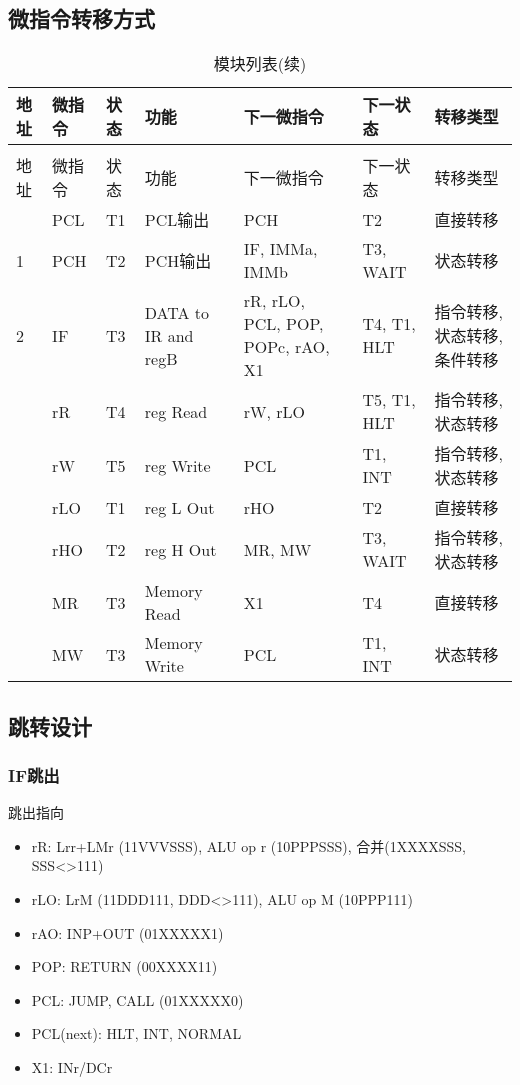 \documentclass[10pt]{book}
\begin{document}
\subsection{微指令转移方式}
\begin{landscape}
\begin{longtable}{|l|l|l|l|l|l|l|}
\caption{微程序表} \\
\hline
地址 & 微指令 & 状态 & 功能 & 下一微指令 & 下一状态 & 转移类型             \\
\hline
\endfirsthead
\caption{模块列表(续)} \\
\hline
地址 & 微指令 & 状态 & 功能 & 下一微指令 & 下一状态 & 转移类型             \\
\hline
\endhead
\hline
\endfoot
0	& PCL	& T1 	& PCL输出 				& PCH 								& T2 			& 直接转移 \\
1	& PCH 	& T2 	& PCH输出 				& IF, IMMa, IMMb					& T3, WAIT 		& 状态转移 \\
2	& IF  	& T3 	& DATA to IR and regB 	& rR, rLO, PCL, POP, POPc, rAO, X1	& T4, T1, HLT	& 指令转移, 状态转移, 条件转移 \\ 
& rR  	& T4 	& reg Read  			& rW, rLO		 					& T5, T1, HLT 	& 指令转移, 状态转移  \\
& rW  	& T5 	& reg Write 			& PCL								& T1, INT		& 指令转移, 状态转移 \\
& rLO 	& T1 	& reg L Out 			& rHO								& T2			& 直接转移 \\
& rHO 	& T2 	& reg H Out 			& MR, MW							& T3, WAIT		& 指令转移, 状态转移 \\
& MR  	& T3	& Memory Read 			& X1								& T4			& 直接转移 \\
& MW  	& T3	& Memory Write 			& PCL								& T1, INT		& 状态转移 \\ 
\end{longtable}
\end{landscape}

\subsection{跳转设计}
\subsubsection{IF跳出}
跳出指向
\begin{itemize}
  \item rR: Lrr+LMr (11VVVSSS), ALU op r (10PPPSSS), 合并(1XXXXSSS, SSS<>111)
  \item rLO: LrM (11DDD111, DDD<>111), ALU op M (10PPP111)
  \item rAO: INP+OUT (01XXXXX1)
  \item POP: RETURN (00XXXX11)
  \item PCL: JUMP, CALL (01XXXXX0)
  \item PCL(next): HLT, INT, NORMAL
  \item X1: INr/DCr
\end{itemize}
\end{document}
